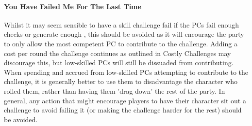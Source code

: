 \paragraph{You Have Failed Me For The Last Time}
Whilst it may seem sensible to have a skill challenge fail if the PCs fail enough checks or generate
enough \despair, this should be avoided as it will encourage the party to only allow the most competent
PC to contribute to the challenge. Adding a cost per round the challenge continues as outlined in Costly
Challenges may discourage this, but low-skilled PCs will still be dissuaded from contributing. When
spending \threat and \despair  accrued from low-skilled PCs attempting to contribute to the challenge,
it is generally better to use them to disadvantage the character who rolled them, rather than having them
'drag down' the rest of the party. In general, any action that might encourage players to have their
character sit out a challenge to avoid failing it (or making the challenge harder for the rest) should be
avoided.

